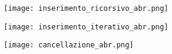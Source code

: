 \begin{figure}[h]
    \texttt{[image: inserimento\_ricorsivo\_abr.png]}
\end{figure}

\begin{figure}[h]
    \texttt{[image: inserimento\_iterativo\_abr.png]}
\end{figure}

\begin{figure}[h]
    \texttt{[image: cancellazione\_abr.png]}
\end{figure}
\clearpage
